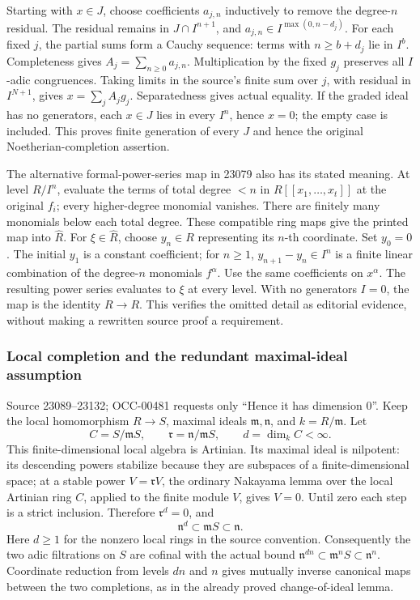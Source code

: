 Starting with \(x\in J\), choose coefficients \(a_{j,n}\) inductively to remove the degree-\(n\) residual. The residual remains in \(J\cap I^{n+1}\), and \(a_{j,n}\in I^{\max(0,n-d_j)}\). For each fixed \(j\), the partial sums form a Cauchy sequence: terms with \(n\geq b+d_j\) lie in \(I^b\). Completeness gives \(A_j=\sum_{n\geq0}a_{j,n}\). Multiplication by the fixed \(g_j\) preserves all \(I\)-adic congruences. Taking limits in the source's finite sum over \(j\), with residual in \(I^{N+1}\), gives \(x=\sum_jA_jg_j\). Separatedness gives actual equality. If the graded ideal has no generators, each \(x\in J\) lies in every \(I^n\), hence \(x=0\); the empty case is included. This proves finite generation of every \(J\) and hence the original Noetherian-completion assertion.

The alternative formal-power-series map in 23079 also has its stated meaning. At level \(R/I^n\), evaluate the terms of total degree \(<n\) in \(R[[x_1,\ldots,x_t]]\) at the original \(f_i\); every higher-degree monomial vanishes. There are finitely many monomials below each total degree. These compatible ring maps give the printed map into \(\widehat R\). For \(\xi\in\widehat R\), choose \(y_n\in R\) representing its \(n\)-th coordinate. Set \(y_0=0\). The initial \(y_1\) is a constant coefficient; for \(n\geq1\), \(y_{n+1}-y_n\in I^n\) is a finite linear combination of the degree-\(n\) monomials \(f^\alpha\). Use the same coefficients on \(x^\alpha\). The resulting power series evaluates to \(\xi\) at every level. With no generators \(I=0\), the map is the identity \(R\to R\). This verifies the omitted detail as editorial evidence, without making a rewritten source proof a requirement.

\subsubsection{Local completion and the redundant maximal-ideal assumption}\label{local-completion-and-the-redundant-maximal-ideal-assumption}

Source 23089--23132; OCC-00481 requests only ``Hence it has dimension 0''. Keep the local homomorphism \(R\to S\), maximal ideals \(\mathfrak m,\mathfrak n\), and \(k=R/\mathfrak m\). Let \[
C=S/\mathfrak mS,\qquad
\mathfrak r=\mathfrak n/\mathfrak mS,\qquad
d=\dim_k C<\infty .
\] This finite-dimensional local algebra is Artinian. Its maximal ideal is nilpotent: its descending powers stabilize because they are subspaces of a finite-dimensional space; at a stable power \(V=\mathfrak rV\), the ordinary Nakayama lemma over the local Artinian ring \(C\), applied to the finite module \(V\), gives \(V=0\). Until zero each step is a strict inclusion. Therefore \(\mathfrak r^d=0\), and \[
\mathfrak n^d\subset\mathfrak mS\subset\mathfrak n.
\] Here \(d\geq1\) for the nonzero local rings in the source convention. Consequently the two adic filtrations on \(S\) are cofinal with the actual bound \(\mathfrak n^{dn}\subset\mathfrak m^nS\subset\mathfrak n^n\). Coordinate reduction from levels \(dn\) and \(n\) gives mutually inverse canonical maps between the two completions, as in the already proved change-of-ideal lemma.

